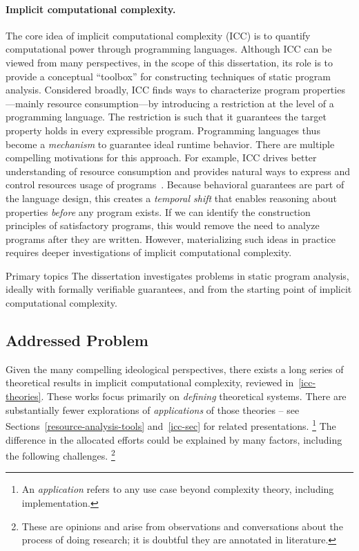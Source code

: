 \paragraph*{Implicit computational complexity.}
The core idea of implicit computational complexity (ICC) is to quantify
computational power through programming languages. Although ICC can be viewed
from many perspectives, in the scope of this dissertation, its role is to
provide a conceptual \enquote{toolbox} for constructing techniques of static
program analysis. Considered broadly, ICC finds ways to characterize program
properties---mainly resource consumption---by introducing a restriction at the
level of a programming language. The restriction is such that it guarantees the
target property holds in every expressible program. Programming languages thus
become a \emph{mechanism} to guarantee ideal runtime behavior. There are
multiple compelling motivations for this approach. For example, ICC drives
better understanding of resource consumption and provides natural ways to
express and control resources usage of programs~\cite{kristiansen2017}. Because
behavioral guarantees are part of the language design, this creates a
\emph{temporal shift} that enables reasoning about properties \emph{before} any
program exists. If we can identify the construction principles of satisfactory
programs, this would remove the need to analyze programs after they are written.
However, materializing such ideas in practice requires deeper investigations of
implicit computational complexity.

\begin{infobox}[]{Primary topics}
The dissertation investigates problems in {static program analysis}, ideally
with {formally verifiable guarantees}, and from the starting point of {implicit
computational complexity}.
\end{infobox}

\subsection{Addressed Problem}
\label{subsec:problem}

Given the many compelling ideological perspectives, there exists a long series of theoretical results in implicit computational complexity, reviewed in~\autoref{icc-theories}.
These works focus primarily on \emph{defining} theoretical systems.
There are substantially fewer explorations of \emph{applications} of those theories -- see Sections~\ref{resource-analysis-tools} and~\ref{icc-sec} for related presentations.%
\footnote{An \emph{application} refers to any use case beyond complexity theory, including implementation.}
The difference in the allocated efforts could be explained by many factors, including the following challenges.%
\footnote{These are opinions and arise from observations and conversations about the process of doing research; it is doubtful they are annotated in literature.}


